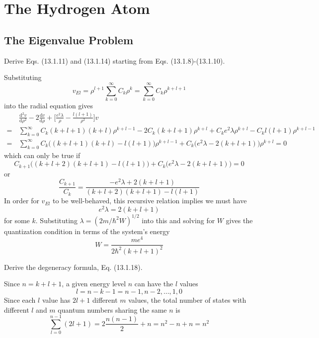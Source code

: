 \documentclass[../principles-of-quantum-mechanics.tex]{subfiles}
\begin{document}
	\printanswers
	
	\setcounter{section}{12}
	\section{The Hydrogen Atom}
	
	\begin{questions}
	\setcounter{subsection}{0}
	\subsection{The Eigenvalue Problem}
	
	\question Derive Eqs. (13.1.11) and (13.1.14) starting from Eqs. (13.1.8)-(13.1.10).
	
	\begin{solution}
		Substituting
		$$v_{El} = \rho^{l+1}\sum_{k=0}^{\infty}C_k\rho^k = \sum_{k=0}^{\infty}C_k\rho^{k + l + 1}$$
		into the radial equation gives
		\begin{align*}
			&\frac{\mathrm{d}^2v}{\mathrm{d}\rho^2} - 2\frac{\mathrm{d}v}{\mathrm{d}\rho} + \Big[\frac{e^2\lambda}{\rho} - \frac{l(l + 1)}{\rho^2}\Big]v \\
			=\,&\sum_{k=0}^{\infty}C_k(k + l + 1)(k + l)\rho^{k + l - 1} - 2C_k(k + l + 1)\rho^{k + l} + C_ke^2\lambda\rho^{k + l} - C_kl(l + 1)\rho^{k + l - 1} \\
			=\,&\sum_{k=0}^{\infty}C_k\big((k + l + 1)(k + l) - l(l + 1)\big)\rho^{k + l - 1} + C_k\big(e^2\lambda - 2(k + l + 1)\big)\rho^{k + l} = 0
		\end{align*}
		which can only be true if
		$$C_{k + 1}\big((k + l + 2)(k + l + 1) - l(l + 1)\big) + C_k\big(e^2\lambda - 2(k + l + 1)\big) = 0$$
		or
		$$\frac{C_{k + 1}}{C_k} = \frac{-e^2\lambda + 2(k + l + 1)}{(k + l + 2)(k + l + 1) - l(l + 1)}$$
		In order for $v_{El}$ to be well-behaved, this recursive relation implies we must have
		$$e^2\lambda = 2(k + l + 1)$$
		for some $k$. Substituting $\lambda = (2m/\hbar^2W)^{1/2}$ into this and solving for $W$ gives the quantization condition in terms of the system's energy
		$$W = \frac{me^4}{2\hbar^2(k + l + 1)^2}$$ 
	\end{solution}
	
	\question Derive the degeneracy formula, Eq. (13.1.18).
	
	\begin{solution}
		Since $n = k + l + 1$, a given energy level $n$ can have the $l$ values
		$$l = n - k - 1 = n - 1, n - 2, \dots, 1, 0$$
		Since each $l$ value has $2l + 1$ different $m$ values, the total number of states with different $l$ and $m$ quantum numbers sharing the same $n$ is
		$$\sum_{l = 0}^{n - 1}(2l + 1) = 2\frac{n(n - 1)}{2} + n = n^2 - n + n = n^2$$
	\end{solution}
	

\end{questions}
\end{document}
